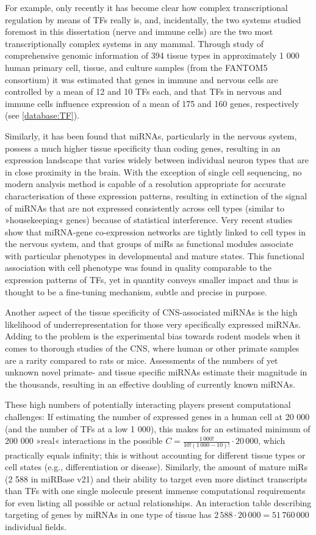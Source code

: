 For example, only recently it has become clear how complex transcriptional regulation by means of TFs really is, and, incidentally, the two systems studied foremost in this dissertation (nerve and immune cells) are the two most transcriptionally complex systems in any mammal. Through study of comprehensive genomic information of 394 tissue types in approximately 1 000 human primary cell, tissue, and culture samples (from the FANTOM5 consortium) it was estimated that genes in immune and nervous cells are controlled by a mean of 12 and 10 TFs each, and that TFs in nervous and immune cells influence expression of a mean of 175 and 160 genes, respectively (see \ref{database:TF}). 

Similarly, it has been found that miRNAs, particularly in the nervous system, possess a much higher tissue specificity than coding genes, resulting in an expression landscape that varies widely between individual neuron types that are in close proximity in the brain. With the exception of single cell sequencing, no modern analysis method is capable of a resolution appropriate for accurate characterisation of these expression patterns, resulting in extinction of the signal of miRNAs that are not expressed consistently across cell types (similar to »housekeeping« genes) because of statistical interference. Very recent studies show that miRNA-gene co-expression networks are tightly linked to cell types in the nervous system, and that groups of miRs as functional modules associate with particular phenotypes in developmental and mature states\cite{Nowakowski2018}. This functional association with cell phenotype was found in quality comparable to the expression patterns of TFs, yet in quantity conveys smaller impact and thus is thought to be a fine-tuning mechanism, subtle and precise in purpose. 

Another aspect of the tissue specificity of CNS-associated miRNAs is the high likelihood of underrepresentation for those very specifically expressed miRNAs. Adding to the problem is the experimental bias towards rodent models when it comes to thorough studies of the CNS, where human or other primate samples are a rarity compared to rats or mice. Assessments of the numbers of yet unknown novel primate- and tissue specific miRNAs estimate their magnitude in the thousands\cite{Londin2015}, resulting in an effective doubling of currently known miRNAs.

These high numbers of potentially interacting players present computational challenges: If estimating the number of expressed genes in a human cell at 20 000 (and the number of TFs at a low 1 000), this makes for an estimated minimum of 200 000 »real« interactions in the possible $ C = \frac{1\,000!}{10!(1\,000-10)!} \cdot 20\,000 $, which practically equals infinity; this is without accounting for different tissue types or cell states (e.g., differentiation or disease). Similarly, the amount of mature miRs (2 588 in miRBase v21) and their ability to target even more distinct transcripts than TFs with one single molecule present immense computational requirements for even listing all possible or actual relationships. An interaction table describing targeting of genes by miRNAs in one type of tissue has $ 2\,588 \cdot 20\,000 = 51\,760\,000 $ individual fields.

